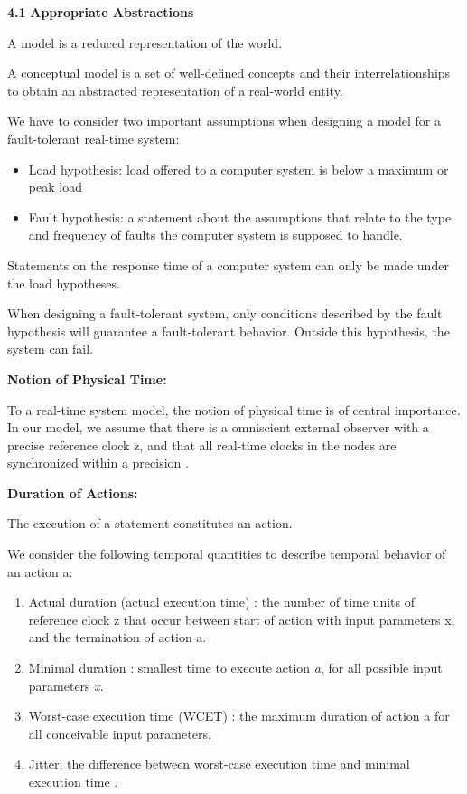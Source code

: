 \textbf{4.1} \protect\hypertarget{teil2}{}{}\textbf{Appropriate
Abstractions}

A model is a reduced representation of the world.

A conceptual model is a set of well-defined concepts and their
interrelationships to obtain an abstracted representation of a
real-world entity.

We have to consider two important assumptions when designing a model for
a fault-tolerant real-time system:

\begin{itemize}
\item
  Load hypothesis: load offered to a computer system is below a maximum
  or peak load
\item
  Fault hypothesis: a statement about the assumptions that relate to the
  type and frequency of faults the computer system is supposed to
  handle.
\end{itemize}

Statements on the response time of a computer system can only be made
under the load hypotheses.

When designing a fault-tolerant system, only conditions described by the
fault hypothesis will guarantee a fault-tolerant behavior. Outside this
hypothesis, the system can fail.

\textbf{Notion of Physical Time:}

To a real-time system model, the notion of physical time is of central
importance. In our model, we assume that there is a omniscient external
observer with a precise reference clock z, and that all real-time clocks
in the nodes are synchronized within a precision .

\textbf{Duration of Actions:}

The execution of a statement constitutes an action.

We consider the following temporal quantities to describe temporal
behavior of an action a:

\begin{enumerate}
\def\labelenumi{\arabic{enumi}.}
\item
  Actual duration (actual execution time) : the number of time units of
  reference clock z that occur between start of action with input
  parameters x, and the termination of action a.
\item
  Minimal duration : smallest time to execute action \emph{a}, for all
  possible input parameters \emph{x}.
\item
  Worst-case execution time (WCET) : the maximum duration of action a
  for all conceivable input parameters.
\item
  Jitter: the difference between worst-case execution time and minimal
  execution time .
\end{enumerate}

